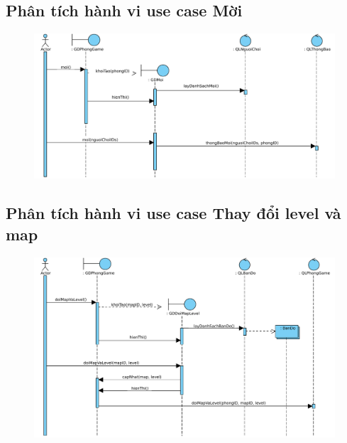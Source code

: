\documentclass[3p]{elsarticle}
\begin{document}
\subsection{Phân tích hành vi use case Mời}
\begin{figure}[!htbp]
	\hspace*{-.5in}
	\centering
	\includegraphics[scale=.55]{images/sequence-pdfs/gamer/PlayGame_Invite.pdf}
\end{figure}
\newpage

\subsection{Phân tích hành vi use case Thay đổi level và map}
\begin{figure}[!htbp]
	\hspace*{-.5in}
	\centering
	\includegraphics[scale=.55]{images/sequence-pdfs/gamer/PlayGame_ChangeMapLevel.pdf}
\end{figure}
\end{document}
